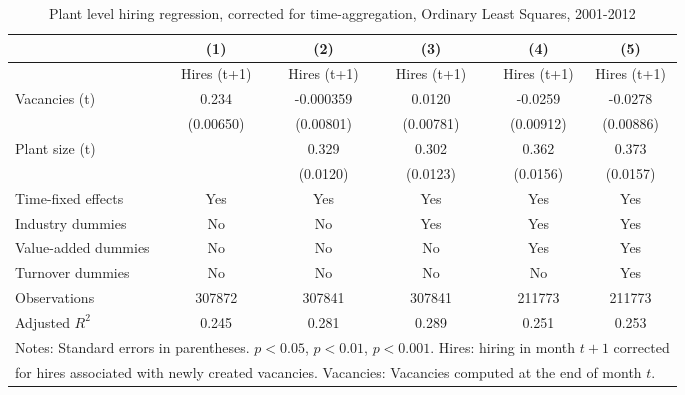 \begin{table}[htbp]
\caption{\label{tab:robust_timeagg} Plant level hiring regression, corrected for time-aggregation, Ordinary Least Squares,  2001-2012}
\begin{tabularx} {\textwidth} { l cXcXcXcc}
\hline
       &   (1) &&     (2) &&    (3)       &&   (4)        &   (5)      \\
\hline
        &   \footnotesize{ Hires (t+1)} &&     \footnotesize{ Hires (t+1)} &&    \footnotesize{ Hires (t+1)}      &&  \footnotesize{ Hires (t+1)}       &   \footnotesize{ Hires (t+1)}     \\
\hline
\footnotesize{Vacancies (t)}        &     0.234\sym{***}&&   -0.000359         & &     0.0120         &&     -0.0259\sym{***}&     -0.0278\sym{***}\\        
                    &    (0.00650)         &&   (0.00801)         &&   (0.00781)         &&   (0.00912)         &   (0.00886)         \\
\footnotesize{Plant size (t)}      &                   &&     0.329\sym{***}&&       0.302\sym{***} &&      0.362\sym{***} &      0.373\sym{***} \\
                    &                   && (0.0120)         &&    (0.0123)         &&    (0.0156)         &    (0.0157)             \\
\hline
\footnotesize{Time-fixed effects}  & Yes                 && Yes                     &&           Yes          &&    Yes        &    Yes      \\
\footnotesize{Industry dummies}   & No                  && No                      &&     Yes                 &&    Yes        &   Yes      \\
\footnotesize{Value-added dummies} & No                  && No                      &&     No                 &&    Yes        &    Yes      \\
\footnotesize{Turnover dummies }   & No                  && No                      &&     No                 &&    No        &    Yes      \\
\hline
Observations        &    307872         &&      307841         &&      307841         &&      211773         &      211773        \\
Adjusted \(R^{2}\)  &     0.245         &&       0.281         &&       0.289         &&       0.251         &       0.253         \\
\hline\hline
\multicolumn{9}{l}{\footnotesize Notes: Standard errors in parentheses. \sym{*} \(p<0.05\), \sym{**} \(p<0.01\), \sym{***} \(p<0.001\). Hires: hiring in month $t+1$ corrected }\\
\multicolumn{9}{l}{\footnotesize for hires associated with  newly created vacancies. Vacancies: Vacancies computed at the end of month $t$.}\\
\end{tabularx}
\end{table}



